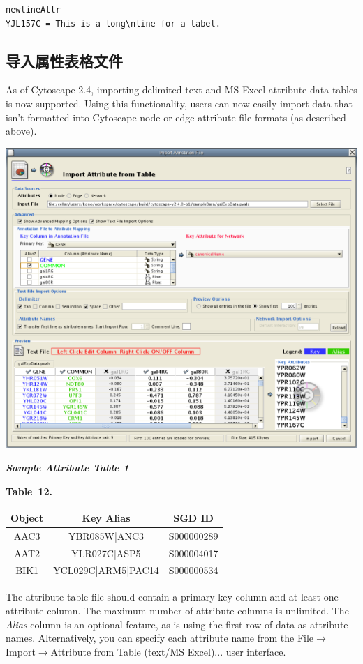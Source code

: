  \begin{verbatim}
newlineAttr
YJL157C = This is a long\nline for a label.
\end{verbatim}

\subsection{导入属性表格文件}

 As of Cytoscape 2.4, importing delimited text and MS Excel attribute data
tables is now supported. Using this functionality, users can now easily import
data that isn't formatted into Cytoscape node or edge attribute file formats
(as described above). 

\centerline{\includegraphics[width=.6\textwidth]{images/attribute_table_import_main.png} }

 \emph{\textbf{Sample Attribute Table 1} }

 \textbf{Table 12. }

\begin{tabular}{|c|c|c|}
\hline 
 Object& Key Alias& SGD ID\\
\hline
 AAC3 &YBR085W|ANC3& S000000289\\
 AAT2 &YLR027C|ASP5& S000004017\\
 BIK1 & YCL029C|ARM5|PAC14 &S000000534\\
 \hline 
\end{tabular}

 The attribute table file should contain a primary key column and at least one
attribute column. The maximum number of attribute columns is unlimited. The
\emph{Alias} column is an optional feature, as is using the first row of data
as attribute names. Alternatively, you can specify each attribute name from the
File$\rightarrow$Import$\rightarrow$Attribute from Table (text/MS Excel)...
user interface. 



